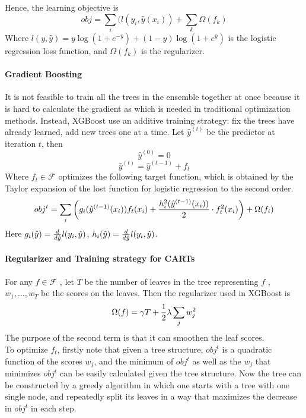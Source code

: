 \documentclass[11pt]{article}
\theoremstyle{plain}
\theoremstyle{definition}
\theoremstyle{remark}
\begin{document}
\noindent Hence, the learning objective is
\begin{equation}
obj=\sum_i(l(y_i,\hat{y}(x_i))+\sum_k\Omega(f_k)
\end{equation}
Where $l(y,\hat{y})=y\log(1+e^{-\hat{y}})+(1-y)\log(1+e^{\hat{y}})$ is the logistic regression loss function, and $\Omega(f_k)$ is the regularizer.

\paragraph{Gradient Boosting}
It is not feasible to train all the trees in the ensemble together at once because it is hard to calculate the gradient as which is needed in traditional optimization methods. Instead, XGBoost use an additive training strategy: fix the trees have already learned, add new trees one at a time. Let $\hat{y}^{(t)}$ be the predictor at iteration $t$, then
\begin{equation}
\hat{y}^{(0)}=0
\end{equation}
\begin{equation}
\hat{y}^{(t)}=\hat{y}^{(t-1)}+f_t
\end{equation}
Where $f_t\in\mathcal{F}$ optimizes the following target function, which is obtained by the Taylor expansion of the lost function for logistic regression to the second order.
\begin{equation}
obj^t=\sum_i\left(g_i(\hat{y}^{(t-1)}(x_i))f_t(x_i)+{h_i^2(\hat{y}^{(t-1)}(x_i))\over 2}\cdot f_t^2(x_i)\right)+\Omega(f_i)
\end{equation}
Here $g_i(\hat{y})={d\over d\hat{y}}l(y_i,\hat{y})$, $h_i(\hat{y})={d\over d\hat{y}}l(y_i,\hat{y})$.

\paragraph{Regularizer and Training strategy for CARTs}

For any $f\in\mathcal{F}$ , let $T$ be the number of leaves in the tree representing $f$ , $w_1,\dots, w_T$ be the scores on
the leaves. Then the regularizer used in XGBoost is
\begin{equation}
\Omega(f)=\gamma T+{1\over 2}\lambda\sum_j w_j^2
\end{equation}
The purpose of the second term is that it can smoothen the leaf scores.\\

\noindent To optimize $f_t$, firstly note that given a tree structure, $obj^t$ is a quadratic function of the scores $w_j$,
and the minimum of $obj^t$ as well as the $w_j$ that minimizes $obj^t$ can be easily calculated given the tree structure. Now the tree can be constructed by a greedy algorithm in which one starts with a tree with
one single node, and repeatedly split its leaves in a way that maximizes the decrease in $obj^t$ in each step.
\end{document}
